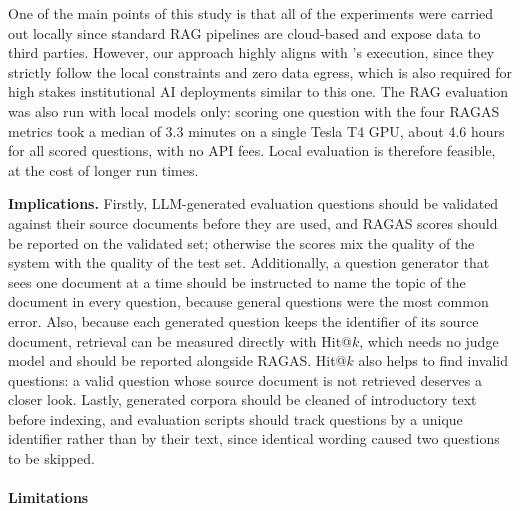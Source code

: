 \documentclass[bdcc,article,submit,pdftex,moreauthors]{Definitions/mdpi}
\begin{document}
One of the main points of this study is that all of the experiments were carried out locally since standard RAG pipelines are cloud-based and expose data to third parties. However, our approach highly aligns with \citet{atkinson2026deterministic}'s execution, since they strictly follow the local constraints and zero data egress, which is also required for high stakes institutional AI deployments similar to this one.
The RAG evaluation was also run with local models only: scoring one question with the four RAGAS metrics took a median of 3.3 minutes on a single Tesla T4 GPU, about 4.6 hours for all scored questions, with no API fees. Local evaluation is therefore feasible, at the cost of longer run times.

\textbf{Implications.} Firstly, LLM-generated evaluation questions should be validated against their source documents before they are used, and RAGAS scores should be reported on the validated set; otherwise the scores mix the quality of the system with the quality of the test set. Additionally, a question generator that sees one document at a time should be instructed to name the topic of the document in every question, because general questions were the most common error. 
Also, because each generated question keeps the identifier of its source document, retrieval can be measured directly with Hit@$k$, which needs no judge model and should be reported alongside RAGAS. Hit@$k$ also helps to find invalid questions: a valid question whose source document is not retrieved deserves a closer look.
Lastly, generated corpora should be cleaned of introductory text before indexing, and evaluation scripts should track questions by a unique identifier rather than by their text, since identical wording caused two questions to be skipped.

\paragraph{Limitations}
\end{document}
